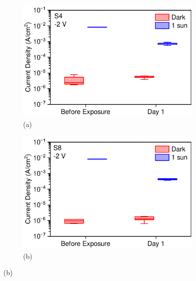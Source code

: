\begin{figure}[ht!]
    \centering
    \begin{subfigure}[t]{0.49\textwidth}
        \centering
        \includegraphics[width=\textwidth]{chapters/stability/imeges/AP44_6_Thesis.pdf} %
        \caption*{(a)}
    \end{subfigure}
    \hfill
    \begin{subfigure}[t]{0.49\textwidth}
        \centering
        \includegraphics[width=\textwidth]{chapters/stability/imeges/AP44_8_Thesis.pdf} %
        \caption*{(b)}
    \end{subfigure}



\end{figure}
